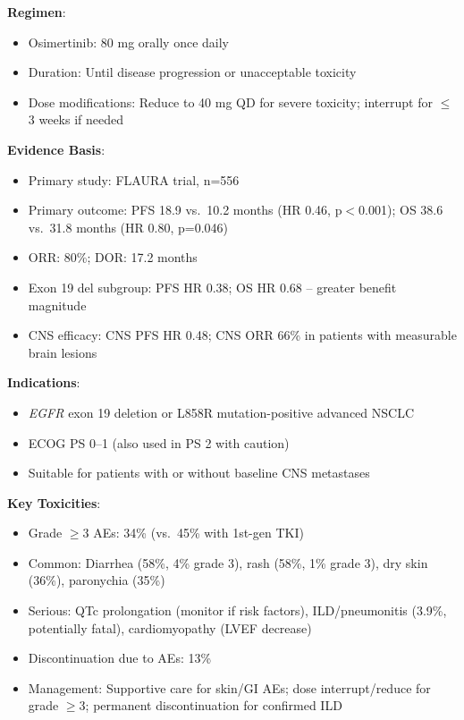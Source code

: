 \documentclass[10pt,letterpaper]{article}
\begin{document}
\begin{tcolorbox}[enhanced,colback=stronggreen!10,colframe=stronggreen,
title={\textbf{Option 1: Osimertinib Monotherapy} \hfill \colorbox{white}{\textbf{STRONG (1A)}}},
fonttitle=\bfseries\small,coltitle=black]
{\small
\textbf{Regimen}:
\begin{itemize}
\item Osimertinib: 80 mg orally once daily
\item Duration: Until disease progression or unacceptable toxicity
\item Dose modifications: Reduce to 40 mg QD for severe toxicity; interrupt for $\leq$3 weeks if needed
\end{itemize}

\textbf{Evidence Basis}:
\begin{itemize}
\item Primary study: FLAURA trial, n=556
\item Primary outcome: PFS 18.9 vs.~10.2 months (HR 0.46, p$<$0.001); OS 38.6 vs.~31.8 months (HR 0.80, p=0.046)
\item ORR: 80\%; DOR: 17.2 months
\item Exon 19 del subgroup: PFS HR 0.38; OS HR 0.68 -- greater benefit magnitude
\item CNS efficacy: CNS PFS HR 0.48; CNS ORR 66\% in patients with measurable brain lesions
\end{itemize}

\textbf{Indications}:
\begin{itemize}
\item \textit{EGFR} exon 19 deletion or L858R mutation-positive advanced NSCLC
\item ECOG PS 0--1 (also used in PS 2 with caution)
\item Suitable for patients with or without baseline CNS metastases
\end{itemize}

\textbf{Key Toxicities}:
\begin{itemize}
\item Grade $\geq$3 AEs: 34\% (vs.~45\% with 1st-gen TKI)
\item Common: Diarrhea (58\%, 4\% grade 3), rash (58\%, 1\% grade 3), dry skin (36\%), paronychia (35\%)
\item Serious: QTc prolongation (monitor if risk factors), ILD/pneumonitis (3.9\%, potentially fatal), cardiomyopathy (LVEF decrease)
\item Discontinuation due to AEs: 13\%
\item Management: Supportive care for skin/GI AEs; dose interrupt/reduce for grade $\geq$3; permanent discontinuation for confirmed ILD
\end{itemize}

}
\end{tcolorbox}
\end{document}
